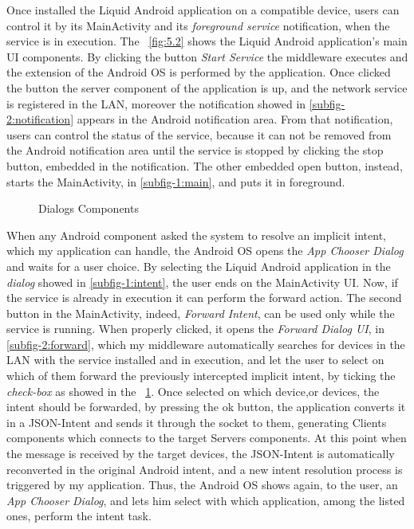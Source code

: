 Once installed the Liquid Android application on a compatible device, users can control it by its MainActivity and its \textit{foreground service} notification, when the service is in execution. The \figurename~\ref{fig:5.2} shows the Liquid Android application's main UI components. By clicking the button \textit{Start Service} the middleware executes and the extension of the Android OS is performed by the application. Once clicked the button the server component of the application is up, and the network service is registered in the LAN, moreover the notification showed in \ref{subfig-2:notification} appears in the Android notification area. From that notification, users can control the status of the service, because it can not be removed from the Android notification area until the service is stopped by clicking the stop button, embedded in the notification. The other embedded open button, instead, starts the MainActivity, in \ref{subfig-1:main}, and puts it in foreground.\\
\begin{figure}[h]
	\centering
	\begin{minipage}{.49\textwidth}\centering
	\end{minipage}
	\begin{minipage}{.49\textwidth}\centering
	\end{minipage}
	\caption{Dialogs Components}
	\label{fig:5.3}
\end{figure}
When any Android component asked the system to resolve an implicit intent, which my application can handle, the Android OS opens the \textit{App Chooser Dialog} and waits for a user choice. By selecting the Liquid Android application in the \textit{dialog} showed in \ref{subfig-1:intent}, the user ends on the MainActivity UI. Now, if the service is already in execution it can perform the forward action. The second button in the MainActivity, indeed, \textit{Forward Intent}, can be used only while the service is running. When properly clicked, it opens the \textit{Forward Dialog UI}, in \ref{subfig-2:forward}, which my middleware automatically searches for devices in the LAN with the service installed and in execution, and let the user to select on which of them forward the previously intercepted implicit intent, by ticking the \textit{check-box} as showed in the \figurename~\ref{fig:5.3}. Once selected on which device,or devices, the intent should be forwarded, by pressing the ok button, the application converts it in a JSON-Intent and sends it through the socket to them, generating Clients components which connects to the target Servers components. At this point when the message is received by the target devices, the JSON-Intent is automatically reconverted in the original Android intent, and a new intent resolution process is triggered by my application. Thus, the Android OS shows again, to the user, an \textit{App Chooser Dialog}, and lets him select with which application, among the listed ones, perform the intent task.
